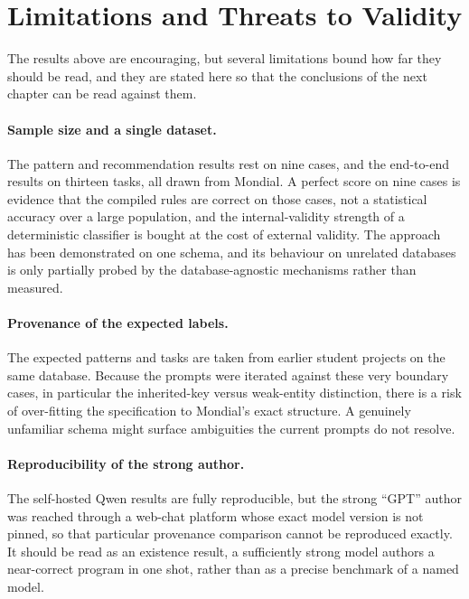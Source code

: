 \section{Limitations and Threats to Validity}
\label{sec:eval-limitations}

The results above are encouraging, but several limitations bound how far they should be read, and they are stated here so that the conclusions of the next chapter can be read against them.

\paragraph{Sample size and a single dataset.} The pattern and recommendation results rest on nine cases, and the end-to-end results on thirteen tasks, all drawn from Mondial. A perfect score on nine cases is evidence that the compiled rules are correct on those cases, not a statistical accuracy over a large population, and the internal-validity strength of a deterministic classifier is bought at the cost of external validity. The approach has been demonstrated on one schema, and its behaviour on unrelated databases is only partially probed by the database-agnostic mechanisms rather than measured.

\paragraph{Provenance of the expected labels.} The expected patterns and tasks are taken from earlier student projects on the same database. Because the prompts were iterated against these very boundary cases, in particular the inherited-key versus weak-entity distinction, there is a risk of over-fitting the specification to Mondial's exact structure. A genuinely unfamiliar schema might surface ambiguities the current prompts do not resolve.

\paragraph{Reproducibility of the strong author.} The self-hosted Qwen results are fully reproducible, but the strong ``GPT'' author was reached through a web-chat platform whose exact model version is not pinned, so that particular provenance comparison cannot be reproduced exactly. It should be read as an existence result, a sufficiently strong model authors a near-correct program in one shot, rather than as a precise benchmark of a named model.

